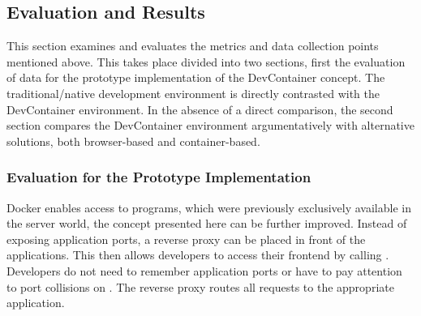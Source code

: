     \subsection{Evaluation and Results}\label{sses::eval_compare}
    This section examines and evaluates the metrics and data collection points mentioned above. This takes place divided into two sections, first the evaluation of data for the prototype implementation of the DevContainer concept. The traditional/native development environment is directly contrasted with the DevContainer environment.
    In the absence of a direct comparison, the second section compares the DevContainer environment argumentatively with alternative solutions, both browser-based and container-based.

        \subsubsection{Evaluation for the Prototype Implementation}
        
        Docker enables access to programs, which were previously exclusively available in the server world, the concept presented here can be further improved. Instead of exposing application ports, a reverse proxy can be placed in front of the applications. This then allows developers to access their frontend by calling . Developers do not need to remember application ports or have to pay attention to port collisions on . The reverse proxy routes all requests to the appropriate application.


